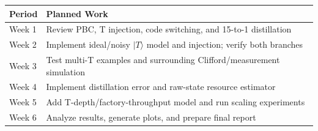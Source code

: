 \documentclass[10pt]{article}
\begin{document}
\begin{center}
\small
\begin{tabular}{@{}ll@{}}
\toprule
\textbf{Period} & \textbf{Planned Work} \\
\midrule
Week 1 & Review PBC, T injection, code switching, and 15-to-1 distillation \\
Week 2 & Implement ideal/noisy $|T\rangle$ model and injection; verify both branches \\
Week 3 & Test multi-T examples and surrounding Clifford/measurement simulation \\
Week 4 & Implement distillation error and raw-state resource estimator \\
Week 5 & Add T-depth/factory-throughput model and run scaling experiments \\
Week 6 & Analyze results, generate plots, and prepare final report \\
\bottomrule
\end{tabular}
\end{center}

{\small


}
\end{document}

